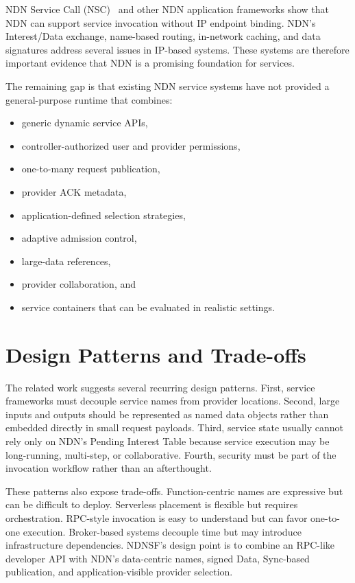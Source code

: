 NDN Service Call (NSC)~\cite{nsc} and other NDN application frameworks show
that NDN can support service invocation without IP endpoint binding. NDN's
Interest/Data exchange, name-based routing, in-network caching, and data
signatures address several issues in IP-based systems. These systems are
therefore important evidence that NDN is a promising foundation for services.

The remaining gap is that existing NDN service systems have not provided a
general-purpose runtime that combines:

\begin{itemize}
  \item generic dynamic service APIs,
  \item controller-authorized user and provider permissions,
  \item one-to-many request publication,
  \item provider ACK metadata,
  \item application-defined selection strategies,
  \item adaptive admission control,
  \item large-data references,
  \item provider collaboration, and
  \item service containers that can be evaluated in realistic settings.
\end{itemize}

\section{Design Patterns and Trade-offs}

The related work suggests several recurring design patterns. First, service
frameworks must decouple service names from provider locations. Second, large
inputs and outputs should be represented as named data objects rather than
embedded directly in small request payloads. Third, service state usually
cannot rely only on NDN's Pending Interest Table because service execution may
be long-running, multi-step, or collaborative. Fourth, security must be part of
the invocation workflow rather than an afterthought.

These patterns also expose trade-offs. Function-centric names are expressive
but can be difficult to deploy. Serverless placement is flexible but requires
orchestration. RPC-style invocation is easy to understand but can favor
one-to-one execution. Broker-based systems decouple time but may introduce
infrastructure dependencies. NDNSF's design point is to combine an RPC-like
developer API with NDN's data-centric names, signed Data, Sync-based
publication, and application-visible provider selection.

